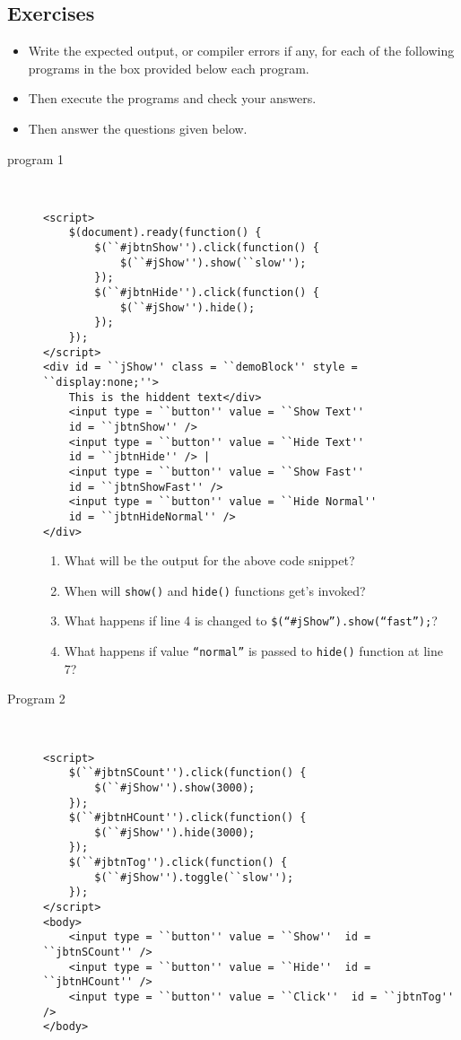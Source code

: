 \documentclass[11pt,a4paper]{article}
\def\AnswerBox{\fbox{\begin{minipage}{4in}\hfill\vspace{0.5in}\end{minipage}}}
\begin{document}
\subsection*{Exercises}
\begin{itemize}
\item Write the expected output, or compiler errors if any, for each of the following programs in the box provided below each program.
\item Then execute the programs and check your answers.
\item Then answer the questions given below.
\end{itemize}
\begin{description}
\item[program 1]\
\begin{lstlisting}
<script>
    $(document).ready(function() {
        $(``#jbtnShow'').click(function() {
            $(``#jShow'').show(``slow'');
        });
        $(``#jbtnHide'').click(function() {
            $(``#jShow'').hide();
        });
    });
</script>
<div id = ``jShow'' class = ``demoBlock'' style = ``display:none;''>
    This is the hiddent text</div>
    <input type = ``button'' value = ``Show Text'' 
    id = ``jbtnShow'' />
    <input type = ``button'' value = ``Hide Text'' 
    id = ``jbtnHide'' /> |
    <input type = ``button'' value = ``Show Fast'' 
    id = ``jbtnShowFast'' />
    <input type = ``button'' value = ``Hide Normal'' 
    id = ``jbtnHideNormal'' />
</div>
\end{lstlisting}

\AnswerBox

\begin{enumerate}[label=\bfseries Q\arabic*:]\itemsep10pt
\item What will be the output for the above code snippet?
\item When will \texttt{show()} and \texttt{hide()} functions get's invoked?
\item What happens if line 4 is changed to \texttt{\$(``\#jShow'').show(``fast'');}?
\item What happens if value \texttt{``normal''} is passed to \texttt{hide()} function at line 7?
\end{enumerate}

\item[Program 2]\
\begin{lstlisting}
<script>
    $(``#jbtnSCount'').click(function() {
        $(``#jShow'').show(3000);
    });
    $(``#jbtnHCount'').click(function() {
        $(``#jShow'').hide(3000);
    });
    $(``#jbtnTog'').click(function() {
        $(``#jShow'').toggle(``slow'');
    });
</script>
<body>
    <input type = ``button'' value = ``Show''  id = ``jbtnSCount'' />
    <input type = ``button'' value = ``Hide''  id = ``jbtnHCount'' /> 
    <input type = ``button'' value = ``Click''  id = ``jbtnTog'' />
</body>
\end{lstlisting}


\end{description}
\end{document}
